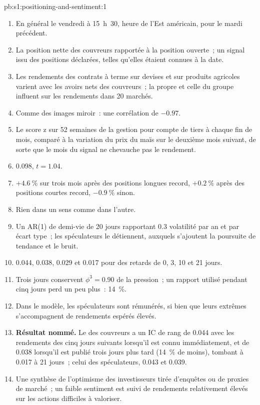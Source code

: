 \begin{solution}{pb:s1:positioning-and-sentiment:1}
\begin{enumerate}
\item En général le vendredi à 15~h~30, heure de l'Est américain, pour le mardi précédent.
\item La position nette des couvreurs rapportée à la position ouverte~; un signal issu des positions déclarées, telles qu'elles étaient connues à la date.
\item Les rendements des contrats à terme sur devises et sur produits agricoles varient avec les avoirs nets des couvreurs~; la  propre et celle du groupe influent sur les rendements dans 20 marchés.
\item Comme des images miroir~: une corrélation de $-0.97$.
\item Le score z sur 52 semaines de la gestion pour compte de tiers à chaque fin de mois, comparé à la variation du prix du maïs sur le deuxième mois suivant, de sorte que le mois du signal ne
chevauche pas le rendement.
\item 0.098, $t = 1.04$.
\item $+4.6~\%$ sur trois mois après des positions longues record, $+0.2~\%$ après des positions courtes record, $-0.9~\%$ sinon.
\item Rien dans un sens comme dans l'autre.
\item Un AR(1) de demi-vie de 20 jours rapportant 0.3 volatilité par an et par écart type~; les spéculateurs le détiennent, auxquels s'ajoutent la poursuite de tendance et le bruit.
\item 0.044, 0.038, 0.029 et 0.017 pour des retards de 0, 3, 10 et 21 jours.
\item Trois jours conservent $\phi^3 = 0.90$ de la pression~; un rapport utilisé pendant cinq jours perd un peu plus~: 14~\%.
\item Dans le modèle, les spéculateurs sont rémunérés, si bien que leurs extrêmes s'accompagnent de rendements espérés élevés.
\item \textbf{Résultat nommé.} Le  des couvreurs a un IC de rang de 0.044 avec les rendements des cinq jours suivants lorsqu'il est connu immédiatement, et de 0.038
lorsqu'il est publié trois jours plus tard (14~\% de moins), tombant à 0.017 à 21 jours~; celui des spéculateurs, 0.043 et 0.039.
\item Une synthèse de l'optimisme des investisseurs tirée d'enquêtes ou de proxies de marché~; un faible sentiment est suivi de rendements relativement élevés sur les actions difficiles à valoriser.

\end{enumerate}
\end{solution}
